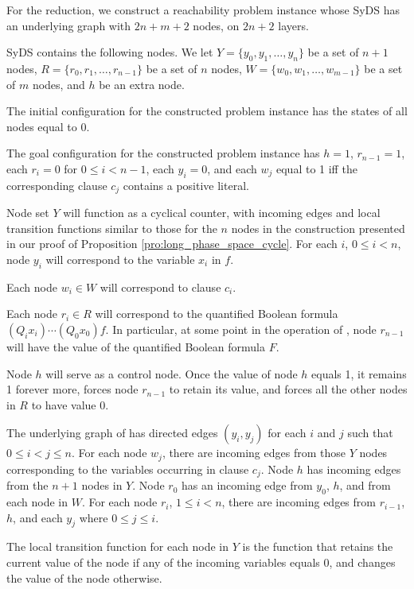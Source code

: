 For the reduction, we construct a reachability problem instance whose SyDS \cals{} 
has an underlying graph with $2n+m+2$ nodes, on $2n+2$ layers. 

SyDS \cals{} contains the following nodes.
We let $Y = \{y_0, y_1, \dots , y_n\}$ be a set of $n+1$ nodes,
$R = \{r_0, r_1, \dots , r_{n-1}\}$ be a set of $n$ nodes,
$W = \{w_0, w_1, \dots , w_{m-1}\}$ be a set of $m$ nodes,
 and $h$ be an extra node.
 
The initial configuration \calc{} for the constructed problem instance
 has the states of all nodes equal to 0.

The goal configuration \cald{} for the constructed problem instance 
has $h =1$, $r_{n-1} = 1$,  each  $r_i= 0$ for $0 \leq i  < n-1$, 
each  $y_i= 0$, 
and each $w_j$ equal to 1 iff the corresponding clause $c_j$ contains a positive literal.

Node set $Y$ will function as a cyclical counter,
with incoming edges and local transition functions similar to those for
the $n$ nodes in the construction presented in our
proof of Proposition \ref{pro:long_phase_space_cycle}.
For each $i$, $0 \leq i < n$,
node $y_i$ will correspond to the variable $x_i$ in $f$.

Each node $w_i \in W$ will correspond to clause $c_i$.

Each node $r_i \in R$ will correspond to the quantified Boolean formula
$(Q_i x_i) \cdots  (Q_0 x_0) f$.
In particular, at some point in the operation of \cals{},
node $r_{n-1}$ will have the value of the quantified Boolean formula $F$.

Node $h$ will serve as a control node.
Once the value of node $h$ equals 1,  it remains 1 forever more,
forces node $r_{n-1}$ to retain its value, and forces all the other nodes in $R$ to have value 0.

The underlying graph of \cals{} has directed edges
$(y_i, y_j)$ for each $i$ and $j$ such that $0 \leq i < j \leq n$.
For each node $w_j$, there are incoming edges from those $Y$ nodes
corresponding to the variables occurring in clause $c_j$.
Node $h$ has incoming edges from the $n+1$ nodes in $Y$.
Node $r_0$ has an incoming edge from $y_0$, $h$, and from each node in $W$.
For each node $r_i$, $1 \leq i < n$,
there are incoming edges from $r_{i-1}$, $h$, and each $y_j$ where $0 \leq j \leq i$.


The local transition function for each node in $Y$ is the function 
that retains the current value of the node if any of the incoming variables equals 0,
and changes the value of the node otherwise.

